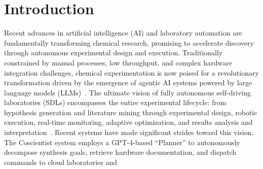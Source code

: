 \documentclass[sn-nature, twocolumn]{sn-jnl}%
\theoremstyle{thmstyleone}%
\theoremstyle{thmstyletwo}%
\theoremstyle{thmstylethree}%
\begin{document}



\maketitle

\section{Introduction}\label{sec1}

Recent advances in artificial intelligence (AI)\cite{openai2024gpt4technicalreport, deepseekai2025, shinn_reflexion_2023, wang2024executablecodeactionselicit, schulman2017proximalpolicyoptimizationalgorithms,rafailov2024directpreferenceoptimizationlanguage,xu2025wizardlmempoweringlargepretrained, openai2025competitiveprogramminglargereasoning} and laboratory automation\cite{burger_mobile_2020,zhao_robotic_2023, manzano_autonomous_2022, slattery_automated_2024,jiang_autonomous_2023, greenaway_high-throughput_2018,lunt_modular_2024} are fundamentally transforming chemical research, promising to accelerate discovery through autonomous experimental design and execution.\cite{doi:10.1126/science.abc2986,doi:10.1126/science.aaa5414, manzano_autonomous_2022, greenaway_high-throughput_2018, granda_controlling_2018, he_algorithm-driven_2024, szymanski_autonomous_2023, zhu_automated_2024} Traditionally constrained by manual processes, low throughput, and complex hardware integration challenges, chemical experimentation is now poised for a revolutionary transformation driven by the emergence of agentic AI systems powered by large language models (LLMs)~\cite{gridach2025agenticaiscientificdiscovery,boiko_autonomous_2023, boiko2023emergentautonomousscientificresearch, campbell2025mdcrowautomatingmoleculardynamics, song_multiagent-driven_2025,vemprala_chatgpt_2024}. The ultimate vision of fully autonomous self-driving laboratories (SDLs)\cite{bennett_autonomous_2024, canty_science_2025, tom_self-driving_2024, macleod_self-driving_2020} encompasses the entire experimental lifecycle: from hypothesis generation and literature mining through experimental design, robotic execution, real-time monitoring, adaptive optimization, and results analysis and interpretation~\cite{yang2024largelanguagemodelsautomated, zhou2025hypothesispublicationcomprehensivesurvey, internagentteam2025internagentagentscientist, takagi2023autonomoushypothesisverificationlanguage, takagi2023autonomoushypothesisverificationlanguage, rabby2025iterativehypothesisgenerationscientific, newman2024arxivdigestablessynthesizingscientificliterature, chen2025chemminerlargelanguagemodel, song2024trialerrorexplorationbasedtrajectory}.  Recent systems have made significant strides toward this vision. The Coscientist system employs a GPT-4-based ``Planner'' to autonomously decompose synthesis goals, retrieve hardware documentation, and dispatch commands to cloud laboratories and 
\end{document}
